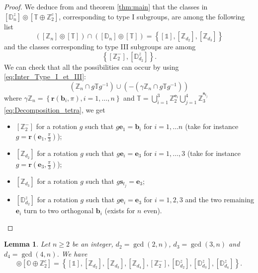 \documentclass[11pt,a4paper]{amsart}
\newtheorem{lem}[thm]{Lemma}
\theoremstyle{definition}
\newcommand{\ZZ}{\mathbb{Z}}                %
\newcommand{\octa}{\mathbb{O}}              %
\newcommand{\tetra}{\mathbb{T}}             %
\newcommand{\DD}{\mathbb{D}}                %
\newcommand{\1}{\mathds{1}}		            %
\newcommand{\ee}{\pmb{e}}                   %
\newcommand{\vR}{\mathbf{r}}
\newcommand{\bb}{\mathbf{b}}
\newcommand{\set}[1]{\left\{#1\right\}}     %
\newcommand{\Dnz}{\DD_n^z}
\begin{document}
\begin{proof}
	We deduce from \cite[table 1]{Olive2019} and theorem \ref{thm:main} that the classes in $[\DD_n^z]\circledcirc [\tetra\oplus \ZZ_2^c]$, corresponding to type I subgroups, are among the following list
\begin{equation*}
([\ZZ_n]\circledcirc [\tetra])\cap ([\DD_n]\circledcirc[\tetra])=\set{[\1],[\ZZ_{d_2}],[\ZZ_{d_3}]}
\end{equation*}
and the classes corresponding to type III subgroups are among
\begin{equation*}
\set{[\ZZ_2^-],[\DD_{d_2}^z]}.
\end{equation*}
We can check that all the possibilities can occur by using \eqref{eq:Inter_Type_I_et_III}:
\begin{equation*}
(\ZZ_n\cap g \tetra g^{-1})\cup (-(\gamma\ZZ_n\cap g \tetra g^{-1}))
\end{equation*}
where $ \gamma\ZZ_n=\set{\vR(\bb_i,\pi),i=1,\dotsc,n}$ and $\tetra=\bigcup_{i=1}^3\ZZ_2^{\ee_i}\bigcup_{j=1}^4 \ZZ_3^{\pmb{s}_{t_j}}$ \eqref{eq:Decomposition_tetra},
we get
\begin{itemize}

	\item $[\ZZ_2^-]$ for a rotation $g$ such that $g\ee_1=\bb_i$ for $ i=1,\dotsc n$ (take for instance $g=\vR\left(\ee_1,\frac{\pi}{3}\right)$);
	\item $[\ZZ_{d_2}]$ for a rotation $g$ such that $g\ee_i= \ee_3$ for $i=1,\dotsc,3$ (take for instance $g=\vR\left(\ee_3,\frac{\pi}{3}\right)$);
	\item $[\ZZ_{d_3}]$ for a rotation $g$ such that $g\pmb{s}_{t_j}= \ee_3$;
	\item $[\DD_{d_2}^z]$ for a rotation $g$ such that $g\ee_i=\ee_3$ for $i=1,2,3$ and the two remaining $\ee_i$ turn to two orthogonal $\bb_{i}$ (exists for $n$ even).
\end{itemize}
\end{proof}





\begin{lem}
Let $n\geq 2$ be an integer, $d_2=\gcd(2,n)$, $d_3=\gcd(3,n)$ and $d_4=\gcd(4,n)$. We have
		\begin{equation*}
		[\Dnz] \circledcirc [\octa \oplus \ZZ_2^c]   =\set{[\1],[\ZZ_{d_2}],[\ZZ_{d_3}],[\ZZ_{d_4}],[\ZZ_{2}^{-}],[\DD_{d_2}^{z}],[\DD_{d_3}^z],[\DD_{d_4}^z]  }.
		\end{equation*}
	
	\end{lem}
	
\end{document}

